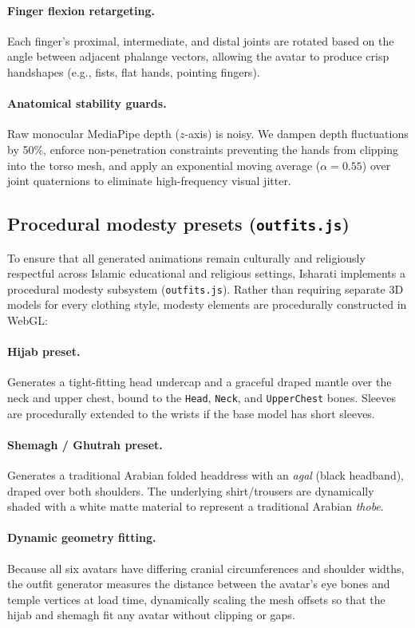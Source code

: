 \paragraph{Finger flexion retargeting.} Each finger's proximal, intermediate, and distal joints are rotated based on the angle between adjacent phalange vectors, allowing the avatar to produce crisp handshapes (e.g., fists, flat hands, pointing fingers).

\paragraph{Anatomical stability guards.} Raw monocular MediaPipe depth ($z$-axis) is noisy. We dampen depth fluctuations by 50\%, enforce non-penetration constraints preventing the hands from clipping into the torso mesh, and apply an exponential moving average ($\alpha{=}0.55$) over joint quaternions to eliminate high-frequency visual jitter.

\subsection{Procedural modesty presets (\texttt{outfits.js})}
To ensure that all generated animations remain culturally and religiously respectful across Islamic educational and religious settings, Isharati implements a procedural modesty subsystem (\texttt{outfits.js}). Rather than requiring separate 3D models for every clothing style, modesty elements are procedurally constructed in WebGL:

\paragraph{Hijab preset.} Generates a tight-fitting head undercap and a graceful draped mantle over the neck and upper chest, bound to the \texttt{Head}, \texttt{Neck}, and \texttt{UpperChest} bones. Sleeves are procedurally extended to the wrists if the base model has short sleeves.

\paragraph{Shemagh / Ghutrah preset.} Generates a traditional Arabian folded headdress with an \emph{agal} (black headband), draped over both shoulders. The underlying shirt/trousers are dynamically shaded with a white matte material to represent a traditional Arabian \emph{thobe}.

\paragraph{Dynamic geometry fitting.} Because all six avatars have differing cranial circumferences and shoulder widths, the outfit generator measures the distance between the avatar's eye bones and temple vertices at load time, dynamically scaling the mesh offsets so that the hijab and shemagh fit any avatar without clipping or gaps.

